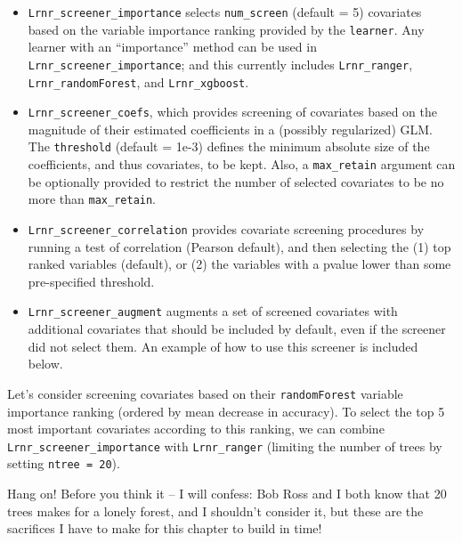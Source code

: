\documentclass[12pt, krantz2,]{book}
\providecommand{\tightlist}{%
  \setlength{\itemsep}{0pt}\setlength{\parskip}{0pt}}
\theoremstyle{definition}
\theoremstyle{definition}
\theoremstyle{definition}
\newcommand{\1}{\mathbbm{1}}
\begin{document}
\begin{itemize}
\tightlist
\item
  \texttt{Lrnr\_screener\_importance} selects \texttt{num\_screen} (default = 5) covariates
  based on the variable importance ranking provided by the \texttt{learner}. Any
  learner with an ``importance'' method can be used in \texttt{Lrnr\_screener\_importance};
  and this currently includes \texttt{Lrnr\_ranger}, \texttt{Lrnr\_randomForest}, and
  \texttt{Lrnr\_xgboost}.
\item
  \texttt{Lrnr\_screener\_coefs}, which provides screening of covariates based on the
  magnitude of their estimated coefficients in a (possibly regularized) GLM.
  The \texttt{threshold} (default = 1e-3) defines the minimum absolute size of the
  coefficients, and thus covariates, to be kept. Also, a \texttt{max\_retain} argument
  can be optionally provided to restrict the number of selected covariates to
  be no more than \texttt{max\_retain}.
\item
  \texttt{Lrnr\_screener\_correlation} provides covariate screening procedures by
  running a test of correlation (Pearson default), and then selecting the (1)
  top ranked variables (default), or (2) the variables with a pvalue lower than
  some pre-specified threshold.
\item
  \texttt{Lrnr\_screener\_augment} augments a set of screened covariates with additional
  covariates that should be included by default, even if the screener did not
  select them. An example of how to use this screener is included below.
\end{itemize}

Let's consider screening covariates based on their \texttt{randomForest} variable
importance ranking (ordered by mean decrease in accuracy). To select the top
5 most important covariates according to this ranking, we can combine
\texttt{Lrnr\_screener\_importance} with \texttt{Lrnr\_ranger} (limiting the number of trees by
setting \texttt{ntree\ =\ 20}).

Hang on! Before you think it -- I will confess: Bob Ross and I both know that 20
trees makes for a lonely forest, and I shouldn't consider it, but these are the
sacrifices I have to make for this chapter to build in time!
\end{document}

